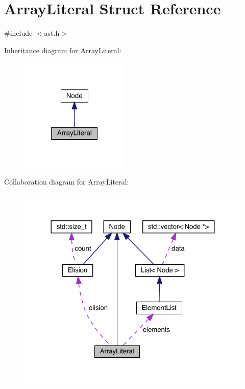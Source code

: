 \hypertarget{struct_array_literal}{}\section{Array\+Literal Struct Reference}
\label{struct_array_literal}


{\ttfamily \#include $<$ast.\+h$>$}



Inheritance diagram for Array\+Literal\+:
\nopagebreak
\begin{figure}[H]
\begin{center}
\leavevmode
\includegraphics[width=147pt]{struct_array_literal__inherit__graph}
\end{center}
\end{figure}


Collaboration diagram for Array\+Literal\+:
\nopagebreak
\begin{figure}[H]
\begin{center}
\leavevmode
\includegraphics[width=324pt]{struct_array_literal__coll__graph}
\end{center}
\end{figure}
